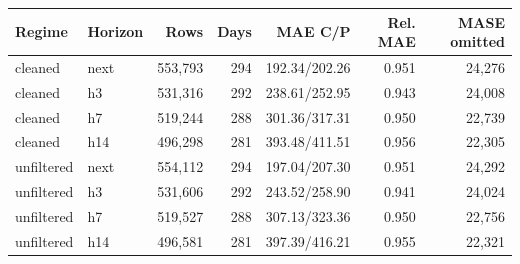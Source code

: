 \begin{tabular}{@{}llrrrrr@{}}\toprule
Regime & Horizon & Rows & Days & MAE C/P & Rel. MAE & MASE omitted\\\midrule
cleaned & next & 553,793 & 294 & 192.34/202.26 & 0.951 & 24,276 \\
cleaned & h3 & 531,316 & 292 & 238.61/252.95 & 0.943 & 24,008 \\
cleaned & h7 & 519,244 & 288 & 301.36/317.31 & 0.950 & 22,739 \\
cleaned & h14 & 496,298 & 281 & 393.48/411.51 & 0.956 & 22,305 \\
unfiltered & next & 554,112 & 294 & 197.04/207.30 & 0.951 & 24,292 \\
unfiltered & h3 & 531,606 & 292 & 243.52/258.90 & 0.941 & 24,024 \\
unfiltered & h7 & 519,527 & 288 & 307.13/323.36 & 0.950 & 22,756 \\
unfiltered & h14 & 496,581 & 281 & 397.39/416.21 & 0.955 & 22,321 \\
\bottomrule\end{tabular}
